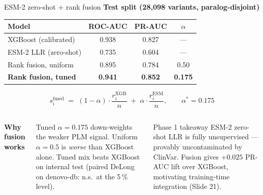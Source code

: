 \documentclass[aspectratio=169,10pt]{beamer}
\begin{document}
\begin{frame}{ESM-2 zero-shot + rank fusion}
  \footnotesize
  \centering
  \textbf{Test split (28{,}098 variants, paralog-disjoint)}
  \vspace{0.3em}
  \begin{tabular}{@{}l c c c@{}}
    \toprule
    Model & ROC-AUC & PR-AUC & $\alpha$ \\
    \midrule
    XGBoost (calibrated)           & 0.938 & 0.827 & ---   \\
    ESM-2 LLR (zero-shot)          & 0.735 & 0.604 & ---   \\
    Rank fusion, uniform           & 0.895 & 0.784 & 0.50  \\
    \rowcolor{kkuGoldLight}
    \textbf{Rank fusion, tuned}    & \textbf{0.941} & \textbf{0.852} & \textbf{0.175} \\
    \bottomrule
  \end{tabular}

  \vspace{0.5em}
  \scriptsize
  \[
    s_i^{\text{fused}} \;=\; (1 - \alpha) \cdot \frac{r_i^{\text{XGB}}}{n}
                            \;+\; \alpha \cdot \frac{r_i^{\text{ESM}}}{n},
    \qquad \alpha^{*} = 0.175
  \]

  \vspace{0.4em}
  \begin{columns}[T]
    \textbf{\textcolor{kkuGreen}{Why fusion works}}
    \scriptsize\par
    Tuned $\alpha = 0.175$ down-weights the weaker PLM signal.
    Uniform $\alpha = 0.5$ is \emph{worse} than XGBoost alone.
    Tuned mix beats XGBoost on internal test (paired DeLong on
    denovo-db: n.s.\ at the 5\,\% level).

    \begin{exampleblock}{Phase 1 takeaway}
      \scriptsize
      ESM-2 zero-shot LLR is fully unsupervised --- provably uncontaminated
      by ClinVar. Fusion gives $+0.025$ PR-AUC lift over XGBoost, motivating
      training-time integration (Slide 21).
    \end{exampleblock}
  \end{columns}
\end{frame}
\end{document}
